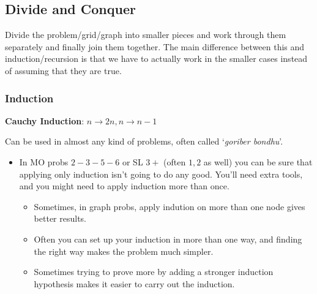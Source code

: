 	\newpage\subsection{Divide and Conquer\label{divide_and_conquer}}

	\vspace{10mm}


	Divide the problem/grid/graph into smaller pieces and work through them separately and finally join them together. The main difference between this and induction/recursion is that we have to actually work in the smaller cases instead of assuming that they are true.

	\begin{enumerate}[wide=0em, label=\arabic*, itemsep=0pt, parsep=0pt, font=\footnotesize\bfseries]

	\end{enumerate}




	\Faka\subsubsection{Induction}{\textbf{Cauchy Induction}: $ n \rightarrow 2n, n \rightarrow n-1 $ }\label{induction}


		Can be used in almost any kind of problems, often called `\textit{goriber bondhu}'.

		\begin{itemize}

			\item In MO probs $ 2-3-5-6 $ or SL $ 3+ $ (often $ 1, 2 $ as well) you can be sure that applying only induction isn't going to do any good. You'll need extra tools, and you might need to apply induction more than once.

			\begin{itemize}

				\item Sometimes, in graph probs, apply indution on more than one node gives better results.
				\item Often you can set up your induction in more than one way, and finding the right way makes the problem much simpler.
				\item Sometimes trying to prove more by adding a stronger induction hypothesis makes it easier to carry out the induction.

			\end{itemize}

		\end{itemize}


